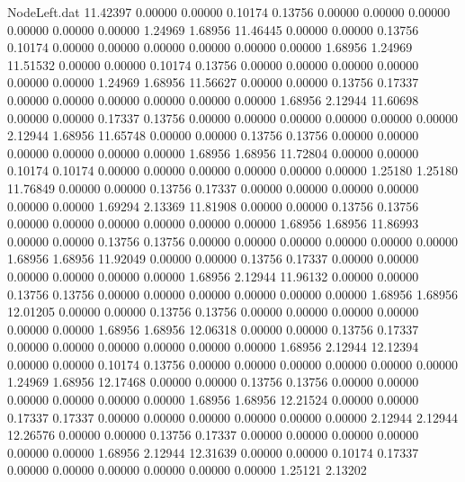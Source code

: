 \begin{filecontents}{NodeLeft.dat}
  11.42397    0.00000    0.00000     0.10174    0.13756    0.00000    0.00000    0.00000    0.00000    0.00000    0.00000    1.24969    1.68956
  11.46445    0.00000    0.00000     0.13756    0.10174    0.00000    0.00000    0.00000    0.00000    0.00000    0.00000    1.68956    1.24969
  11.51532    0.00000    0.00000     0.10174    0.13756    0.00000    0.00000    0.00000    0.00000    0.00000    0.00000    1.24969    1.68956
  11.56627    0.00000    0.00000     0.13756    0.17337    0.00000    0.00000    0.00000    0.00000    0.00000    0.00000    1.68956    2.12944
  11.60698    0.00000    0.00000     0.17337    0.13756    0.00000    0.00000    0.00000    0.00000    0.00000    0.00000    2.12944    1.68956
  11.65748    0.00000    0.00000     0.13756    0.13756    0.00000    0.00000    0.00000    0.00000    0.00000    0.00000    1.68956    1.68956
  11.72804    0.00000    0.00000     0.10174    0.10174    0.00000    0.00000    0.00000    0.00000    0.00000    0.00000    1.25180    1.25180
  11.76849    0.00000    0.00000     0.13756    0.17337    0.00000    0.00000    0.00000    0.00000    0.00000    0.00000    1.69294    2.13369
  11.81908    0.00000    0.00000     0.13756    0.13756    0.00000    0.00000    0.00000    0.00000    0.00000    0.00000    1.68956    1.68956
  11.86993    0.00000    0.00000     0.13756    0.13756    0.00000    0.00000    0.00000    0.00000    0.00000    0.00000    1.68956    1.68956
  11.92049    0.00000    0.00000     0.13756    0.17337    0.00000    0.00000    0.00000    0.00000    0.00000    0.00000    1.68956    2.12944
  11.96132    0.00000    0.00000     0.13756    0.13756    0.00000    0.00000    0.00000    0.00000    0.00000    0.00000    1.68956    1.68956
  12.01205    0.00000    0.00000     0.13756    0.13756    0.00000    0.00000    0.00000    0.00000    0.00000    0.00000    1.68956    1.68956
  12.06318    0.00000    0.00000     0.13756    0.17337    0.00000    0.00000    0.00000    0.00000    0.00000    0.00000    1.68956    2.12944
  12.12394    0.00000    0.00000     0.10174    0.13756    0.00000    0.00000    0.00000    0.00000    0.00000    0.00000    1.24969    1.68956
  12.17468    0.00000    0.00000     0.13756    0.13756    0.00000    0.00000    0.00000    0.00000    0.00000    0.00000    1.68956    1.68956
  12.21524    0.00000    0.00000     0.17337    0.17337    0.00000    0.00000    0.00000    0.00000    0.00000    0.00000    2.12944    2.12944
  12.26576    0.00000    0.00000     0.13756    0.17337    0.00000    0.00000    0.00000    0.00000    0.00000    0.00000    1.68956    2.12944
  12.31639    0.00000    0.00000     0.10174    0.17337    0.00000    0.00000    0.00000    0.00000    0.00000    0.00000    1.25121    2.13202

\end{filecontents}
